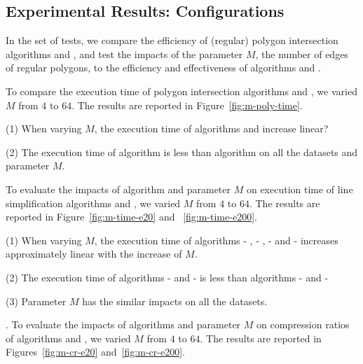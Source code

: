 \subsection{Experimental Results: Configurations}

In the set of tests, we compare the efficiency of (regular) polygon intersection algorithms \rpia and \cpia, and test the impacts of the parameter $M$, \ie the number of edges of regular polygons, to the efficiency and effectiveness of algorithms \cist and \cista.


To compare the execution time of polygon intersection algorithms \rpia and \cpia, we varied $M$ from $4$ to $64$.
The results are reported in Figure~\ref{fig:m-poly-time}.


\ni(1) When varying $M$, the execution time of algorithms \rpia and \cpia increase linear?

\ni(2) The execution time of algorithm \rpia is less than algorithm \cpia on all the datasets and parameter $M$.


To evaluate the impacts of algorithm \rpia and parameter $M$ on execution time of line simplification algorithms \cist and \cista, we varied $M$ from $4$ to $64$.
The results are reported in Figure~\ref{fig:m-time-e20} and ~\ref{fig:m-time-e200}.

\ni(1) When varying $M$, the execution time of algorithms \cist - \rpia, \cist - \cpia, \cista- \rpia and \cista- \cpia increases approximately linear with the increase of $M$.

\ni(2) The execution time of algorithms \cist - \rpia and \cista- \rpia is less than algorithms \cist - \cpia and \cista- \cpia

\ni(3) Parameter $M$ has the similar impacts on all the datasets.

.
To evaluate the impacts of algorithms \rpia and parameter $M$ on compression ratios of algorithms \cist and \cista, we varied $M$ from $4$ to $64$.
The results are reported in Figures~\ref{fig:m-cr-e20} and~\ref{fig:m-cr-e200}.


